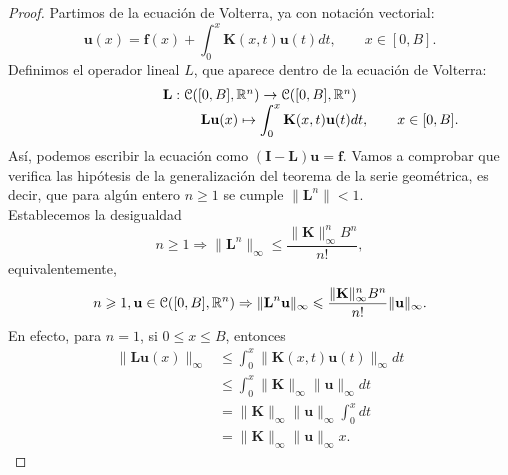 \begin{proof}
	Partimos de la ecuación de Volterra, ya con notación vectorial:
	\begin{equation}
		\textbf{u}(x) = \textbf{f}(x) + \int_0^x \textbf{K}(x,t)\textbf{u}(t)dt, \qquad x \in [0,B].
	\end{equation}
	Definimos el operador lineal $L$, que aparece dentro de la ecuación de Volterra:
	\begin{equation}
		\begin{array}{c}
			\textbf{L}: \mathcal{C}([0,B],\mathbb{R}^n) \rightarrow \mathcal{C}([0,B],\mathbb{R}^n) \\
			\qquad \qquad \qquad \qquad \qquad \textbf{L}\textbf{u}(x) \mapsto \displaystyle \int_{0}^{x} \textbf{K}(x,t)\textbf{u}(t)dt, \qquad x \in [0,B].
		\end{array}
	\end{equation}
	Así, podemos escribir la ecuación como $(\textbf{I}-\textbf{L})\textbf{u} = \textbf{f}$.
	Vamos a comprobar que verifica las hipótesis de la generalización del teorema de la serie geométrica, es decir, que para algún entero $n \geqslant 1$ se cumple $\lVert \textbf{L}^n \rVert < 1$.\\
	Establecemos la desigualdad
	\begin{equation}
		n \geqslant 1 \Rightarrow \lVert \textbf{L}^n \rVert_\infty \leqslant \dfrac{\lVert \textbf{K} \rVert_\infty^nB^n}{n!},
	\end{equation}
	equivalentemente,
	\begin{equation}\label{eq:ref2}
		n \geqslant 1, \textbf{u} \in \mathcal{C}([0,B],\mathbb{R}^n) \Rightarrow \lVert \textbf{L}^n\textbf{u} \rVert_\infty \leqslant \dfrac{\lVert \textbf{K} \rVert_\infty^nB^n}{n!}\lVert \textbf{u} \rVert_\infty.
	\end{equation}
	En efecto, para $n = 1$, si $0 \leqslant x \leqslant B$, entonces
	\begin{equation}
		\begin{split}
			\lVert \textbf{L}\textbf{u}(x) \rVert_\infty & \leqslant \int_{0}^{x} \lVert \textbf{K}(x,t)\textbf{u}(t)\rVert_\infty dt \\
			& \leqslant \int_{0}^{x} \lVert \textbf{K} \rVert_\infty \lVert \textbf{u} \rVert_\infty dt\\
			& = \lVert \textbf{K} \rVert_\infty \lVert \textbf{u} \rVert_\infty \int_{0}^{x}dt\\
			& = \lVert \textbf{K} \rVert_\infty \lVert \textbf{u} \rVert_\infty x.
		\end{split}
	\end{equation}

\end{proof}
